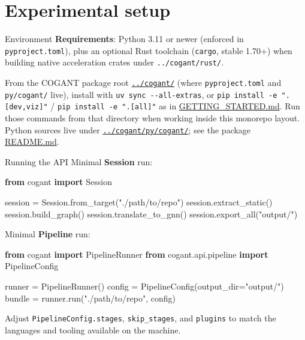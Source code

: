 \documentclass[
  ignorenonframetext,
]{beamer}
\author{\texorpdfstring{}{}}
\date{}
\newenvironment{Shaded}{}{}
\newcommand{\ImportTok}[1]{\textcolor[rgb]{0.00,0.50,0.00}{\textbf{#1}}}
\newcommand{\NormalTok}[1]{#1}
\newcommand{\OperatorTok}[1]{\textcolor[rgb]{0.40,0.40,0.40}{#1}}
\newcommand{\StringTok}[1]{\textcolor[rgb]{0.25,0.44,0.63}{#1}}
\begin{document}
\section{Experimental setup}\label{experimental-setup}

\begin{frame}[fragile]{Environment}
\protect{}\label{environment}
\textbf{Requirements}: Python 3.11 or newer (enforced in
\texttt{pyproject.toml}), plus an optional Rust toolchain
(\texttt{cargo}, stable 1.70+) when building native acceleration crates
under \texttt{../cogant/rust/}.

From the COGANT package root \href{../cogant/}{\texttt{../cogant/}}
(where \texttt{pyproject.toml} and \texttt{py/cogant/} live), install
with \texttt{uv\ sync\ -\/-all-extras}, or
\texttt{pip\ install\ -e\ ".{[}dev,viz{]}"} /
\texttt{pip\ install\ -e\ ".{[}all{]}"} as in
\href{../cogant/GETTING_STARTED.md}{GETTING\_STARTED.md}. Run those
commands from that directory when working inside this monorepo layout.
Python sources live under
\href{../cogant/py/cogant/}{\texttt{../cogant/py/cogant/}}; see the
package \href{../cogant/README.md}{README.md}.
\end{frame}

\begin{frame}[fragile]{Running the API}
\protect{}\label{running-the-api}
Minimal \textbf{Session} run:

\begin{Shaded}
\begin{Highlighting}[]
\ImportTok{from}\NormalTok{ cogant }\ImportTok{import}\NormalTok{ Session}

\NormalTok{session }\OperatorTok{=}\NormalTok{ Session.from\_target(}\StringTok{"./path/to/repo"}\NormalTok{)}
\NormalTok{session.extract\_static()}
\NormalTok{session.build\_graph()}
\NormalTok{session.translate\_to\_gnn()}
\NormalTok{session.export\_all(}\StringTok{"output/"}\NormalTok{)}
\end{Highlighting}
\end{Shaded}

Minimal \textbf{Pipeline} run:

\begin{Shaded}
\begin{Highlighting}[]
\ImportTok{from}\NormalTok{ cogant }\ImportTok{import}\NormalTok{ PipelineRunner}
\ImportTok{from}\NormalTok{ cogant.api.pipeline }\ImportTok{import}\NormalTok{ PipelineConfig}

\NormalTok{runner }\OperatorTok{=}\NormalTok{ PipelineRunner()}
\NormalTok{config }\OperatorTok{=}\NormalTok{ PipelineConfig(output\_dir}\OperatorTok{=}\StringTok{"output/"}\NormalTok{)}
\NormalTok{bundle }\OperatorTok{=}\NormalTok{ runner.run(}\StringTok{"./path/to/repo"}\NormalTok{, config)}
\end{Highlighting}
\end{Shaded}

Adjust \texttt{PipelineConfig.stages}, \texttt{skip\_stages}, and
\texttt{plugins} to match the languages and tooling available on the
machine.
\end{frame}
\end{document}
